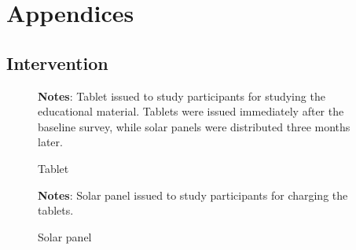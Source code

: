 \documentclass[hidelinks,12pt]{article}
\begin{document}
\begin{singlespace}
\singlespacing
\end{singlespace}

\printbibliography
\pagebreak 
\newpage

\appendix

\section{Appendices} %
\setcounter{figure}{0}
\renewcommand{\thefigure}{B\arabic{figure}}

\setcounter{table}{0}
\renewcommand{\thetable}{B\arabic{table}}

\subsection{Intervention}

\begin{singlespace}
\begin{figure}[H]
\centering
\caption{Tablet}\label{fig:intervention_tablet}
\begin{minipage}{0.95\linewidth}
\vspace{3pt}
\footnotesize{\justify\textbf{Notes}: Tablet issued to study participants for studying the educational material. Tablets were issued immediately after the baseline survey, while solar panels were distributed three months later.}
\end{minipage}
\end{figure}
\end{singlespace}


\begin{singlespace}
\begin{figure}[H]
\centering
\caption{Solar panel}\label{fig:intervention_panel}
\begin{minipage}{0.55\linewidth}
\vspace{3pt}
\footnotesize{\justify\textbf{Notes}: Solar panel issued to study participants for charging the tablets.}
\end{minipage}
\end{figure}
\end{singlespace}
\end{document}
